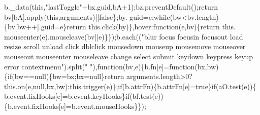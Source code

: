 \begin{DoxyCode}
      b.\_data(\textcolor{keyword}{this},\textcolor{stringliteral}{"lastToggle"}+bx.guid,bA+1);bz.preventDefault();\textcolor{keywordflow}{return} bv[bA].apply(\textcolor{keyword}{this},arguments)||\textcolor{keyword}{false}\};by.
      guid=e;\textcolor{keywordflow}{while}(bw<bv.length)\{bv[bw++].guid=e\}\textcolor{keywordflow}{return} this.click(by)\},hover:\textcolor{keyword}{function}(e,bv)\{\textcolor{keywordflow}{return} this.
      mouseenter(e).mouseleave(bv||e)\}\});b.each((\textcolor{stringliteral}{"blur focus focusin focusout load resize scroll unload click dblclick
       mousedown mouseup mousemove mouseover mouseout mouseenter mouseleave change select submit keydown keypress keyup
       error contextmenu"}).split(\textcolor{stringliteral}{" "}),\textcolor{keyword}{function}(bv,e)\{b.fn[e]=\textcolor{keyword}{function}(bx,bw)\{\textcolor{keywordflow}{if}(bw==null)\{bw=bx;bx=null\}\textcolor{keywordflow}{return} 
      arguments.length>0?this.on(e,null,bx,bw):this.trigger(e)\};\textcolor{keywordflow}{if}(b.attrFn)\{b.attrFn[e]=\textcolor{keyword}{true}\}\textcolor{keywordflow}{if}(aO.test(e))\{
      b.event.fixHooks[e]=b.event.keyHooks\}\textcolor{keywordflow}{if}(bf.test(e))\{b.event.fixHooks[e]=b.event.mouseHooks\}\});


\end{DoxyCode}
